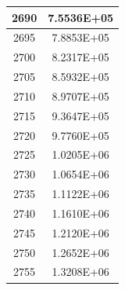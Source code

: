 \documentclass[a4paper]{article}
\begin{document}
\begin{tabular}{|c|c|}
		\hline
		2690 & 7.5536E+05 \\
		\hline
		2695 & 7.8853E+05 \\
		\hline
		2700 & 8.2317E+05 \\
		\hline
		2705 & 8.5932E+05 \\
		\hline
		2710 & 8.9707E+05 \\
		\hline
		2715 & 9.3647E+05 \\
		\hline
		2720 & 9.7760E+05 \\
		\hline
		2725 & 1.0205E+06 \\
		\hline
		2730 & 1.0654E+06 \\
		\hline
		2735 & 1.1122E+06 \\
		\hline
		2740 & 1.1610E+06 \\
		\hline
		2745 & 1.2120E+06 \\
		\hline
		2750 & 1.2652E+06 \\
		\hline
		2755 & 1.3208E+06 \\
		\hline
	\end{tabular}
	\hfill
\end{document}

